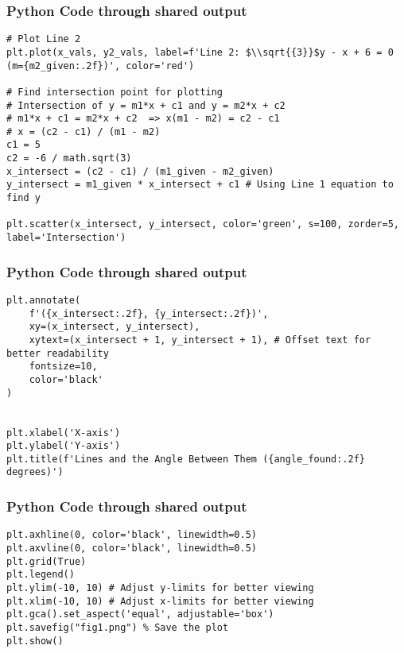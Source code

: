 \documentclass{beamer}
\begin{document}
\begin{frame}[fragile]
\frametitle{Python Code through shared output }

\begin{lstlisting}
# Plot Line 2
plt.plot(x_vals, y2_vals, label=f'Line 2: $\\sqrt{{3}}$y - x + 6 = 0 (m={m2_given:.2f})', color='red')

# Find intersection point for plotting
# Intersection of y = m1*x + c1 and y = m2*x + c2
# m1*x + c1 = m2*x + c2  => x(m1 - m2) = c2 - c1
# x = (c2 - c1) / (m1 - m2)
c1 = 5
c2 = -6 / math.sqrt(3)
x_intersect = (c2 - c1) / (m1_given - m2_given)
y_intersect = m1_given * x_intersect + c1 # Using Line 1 equation to find y

plt.scatter(x_intersect, y_intersect, color='green', s=100, zorder=5, label='Intersection')
\end{lstlisting}
\end{frame}

\begin{frame}[fragile]
\frametitle{Python Code through shared output }

\begin{lstlisting}
plt.annotate(
    f'({x_intersect:.2f}, {y_intersect:.2f})',
    xy=(x_intersect, y_intersect),
    xytext=(x_intersect + 1, y_intersect + 1), # Offset text for better readability
    fontsize=10,
    color='black'
)


plt.xlabel('X-axis')
plt.ylabel('Y-axis')
plt.title(f'Lines and the Angle Between Them ({angle_found:.2f} degrees)')
\end{lstlisting}
\end{frame}

\begin{frame}[fragile]
\frametitle{Python Code through shared output }

\begin{lstlisting}
plt.axhline(0, color='black', linewidth=0.5)
plt.axvline(0, color='black', linewidth=0.5)
plt.grid(True)
plt.legend()
plt.ylim(-10, 10) # Adjust y-limits for better viewing
plt.xlim(-10, 10) # Adjust x-limits for better viewing
plt.gca().set_aspect('equal', adjustable='box')
plt.savefig("fig1.png") % Save the plot
plt.show()
\end{lstlisting}
\end{frame}
\end{document}
